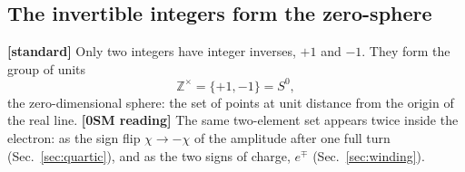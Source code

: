 \documentclass[%
 reprint, amsmath,amssymb, aps, prb, ]{revtex4-2}
\numberwithin{equation}{section}
\begin{document}
\subsection{The invertible integers form the zero-sphere}

\textbf{[standard]} Only two integers have integer inverses, $+1$ and $-1$. They form the group of units
\begin{equation}
\mathbb{Z}^{\times}=\{+1,-1\} = S^0 ,
\label{eq:units}
\end{equation}
the zero-dimensional sphere: the set of points at unit distance from the origin of the real line. \textbf{[0SM reading]} The same two-element set appears twice inside the electron: as the sign flip $\chi\to-\chi$ of the amplitude after one full turn (Sec.~\ref{sec:quartic}), and as the two signs of charge, $e^{\mp}$ (Sec.~\ref{sec:winding}).
\end{document}
